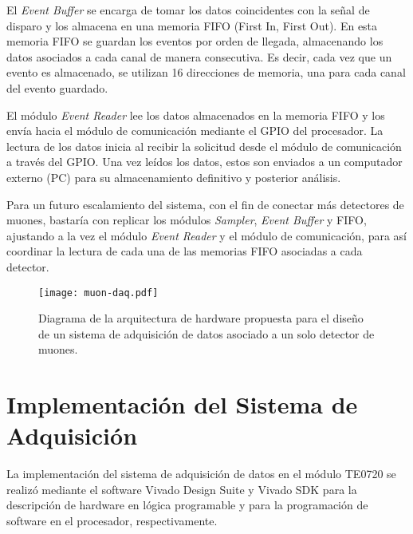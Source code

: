 		El \textit{Event Buffer} se encarga de tomar los datos coincidentes con la señal de disparo y los almacena en una memoria FIFO (First In, First Out). En esta memoria FIFO se guardan los eventos por orden de llegada, almacenando los datos asociados a cada canal de manera consecutiva. Es decir, cada vez que un evento es almacenado, se utilizan 16 direcciones de memoria, una para cada canal del evento guardado.
		
		El módulo \textit{Event Reader} lee los datos almacenados en la memoria FIFO y los envía hacia el módulo de comunicación mediante el GPIO del procesador. La lectura de los datos inicia al recibir la solicitud desde el módulo de comunicación a través del GPIO. Una vez leídos los datos, estos son enviados a un computador externo (PC) para su almacenamiento definitivo y posterior análisis.
		
		Para un futuro escalamiento del sistema, con el fin de conectar más detectores de muones, bastaría con replicar los módulos \textit{Sampler}, \textit{Event Buffer} y FIFO, ajustando a la vez el módulo \textit{Event Reader} y el módulo de comunicación, para así coordinar la lectura de cada una de las memorias FIFO asociadas a cada detector.
		
		
		\begin{figure}[H]
			\centering
			\texttt{[image: muon-daq.pdf]}
			\caption{Diagrama de la arquitectura de hardware propuesta para el diseño de un sistema de adquisición de datos asociado a un solo detector de muones.}
			\label{fig:muon-daq}
		\end{figure}
		
\section{Implementación del Sistema de Adquisición}
	La implementación del sistema de adquisición de datos en el módulo TE0720 se realizó mediante el software Vivado Design Suite y Vivado SDK  para la descripción de hardware en lógica programable y  para la programación de software en el procesador, respectivamente.
	
